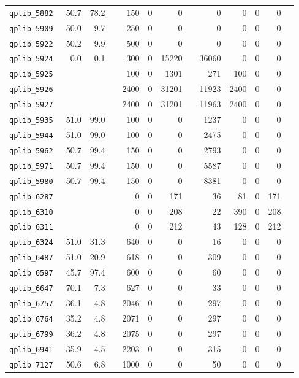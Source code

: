 {\begin{longtable}{lrrrrrrrrrrrr}
{\tt 	qplib\_5882	}	&	50.7	&	78.2	&	&	150	&	0	&	0	&	&	0	&	0	&	0	&	0	\\
{\tt 	qplib\_5909	}	&	50.0	&	9.7	&	&	250	&	0	&	0	&	&	0	&	0	&	0	&	0	\\
{\tt 	qplib\_5922	}	&	50.2	&	9.9	&	&	500	&	0	&	0	&	&	0	&	0	&	0	&	0	\\
{\tt 	qplib\_5924	}	&	0.0	&	0.1	&	&	300	&	0	&	15220	&	&	36060	&	0	&	0	&	0	\\
{\tt 	qplib\_5925	}	&		&		&	&	100	&	0	&	1301	&	&	271	&	100	&	0	&	0	\\
{\tt 	qplib\_5926	}	&		&		&	&	2400	&	0	&	31201	&	&	11923	&	2400	&	0	&	0	\\
{\tt 	qplib\_5927	}	&		&		&	&	2400	&	0	&	31201	&	&	11963	&	2400	&	0	&	0	\\
{\tt 	qplib\_5935	}	&	51.0	&	99.0	&	&	100	&	0	&	0	&	&	1237	&	0	&	0	&	0	\\
{\tt 	qplib\_5944	}	&	51.0	&	99.0	&	&	100	&	0	&	0	&	&	2475	&	0	&	0	&	0	\\
{\tt 	qplib\_5962	}	&	50.7	&	99.4	&	&	150	&	0	&	0	&	&	2793	&	0	&	0	&	0	\\
{\tt 	qplib\_5971	}	&	50.7	&	99.4	&	&	150	&	0	&	0	&	&	5587	&	0	&	0	&	0	\\
{\tt 	qplib\_5980	}	&	50.7	&	99.4	&	&	150	&	0	&	0	&	&	8381	&	0	&	0	&	0	\\
{\tt 	qplib\_6287	}	&		&		&	&	0	&	0	&	171	&	&	36	&	81	&	0	&	171	\\
{\tt 	qplib\_6310	}	&		&		&	&	0	&	0	&	208	&	&	22	&	390	&	0	&	208	\\
{\tt 	qplib\_6311	}	&		&		&	&	0	&	0	&	212	&	&	43	&	128	&	0	&	212	\\
{\tt 	qplib\_6324	}	&	51.0	&	31.3	&	&	640	&	0	&	0	&	&	16	&	0	&	0	&	0	\\
{\tt 	qplib\_6487	}	&	51.0	&	20.9	&	&	618	&	0	&	0	&	&	309	&	0	&	0	&	0	\\
{\tt 	qplib\_6597	}	&	45.7	&	97.4	&	&	600	&	0	&	0	&	&	60	&	0	&	0	&	0	\\
{\tt 	qplib\_6647	}	&	70.1	&	7.3	&	&	627	&	0	&	0	&	&	33	&	0	&	0	&	0	\\
{\tt 	qplib\_6757	}	&	36.1	&	4.8	&	&	2046	&	0	&	0	&	&	297	&	0	&	0	&	0	\\
{\tt 	qplib\_6764	}	&	35.2	&	4.8	&	&	2071	&	0	&	0	&	&	297	&	0	&	0	&	0	\\
{\tt 	qplib\_6799	}	&	36.2	&	4.8	&	&	2075	&	0	&	0	&	&	297	&	0	&	0	&	0	\\
{\tt 	qplib\_6941	}	&	35.9	&	4.5	&	&	2203	&	0	&	0	&	&	315	&	0	&	0	&	0	\\
{\tt 	qplib\_7127	}	&	50.6	&	6.8	&	&	1000	&	0	&	0	&	&	50	&	0	&	0	&	0	\\

\end{longtable}}
